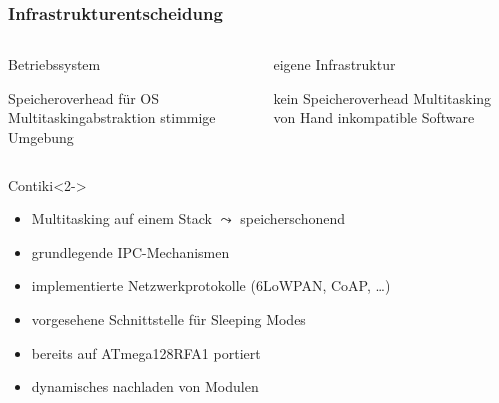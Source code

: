 \subsubsection{Infrastrukturentscheidung}
\begin{frame}{\insertsubsubsection}{}
	\begin{columns}
	\begin{block}{Betriebssystem}
		\begin{proconlist}
		\contra	Speicheroverhead für OS
		\pro	Multitaskingabstraktion
		\pro	stimmige Umgebung
		\end{proconlist}
	\end{block}

	\column{.45\textwidth}
	\begin{block}{eigene Infrastruktur}
		\begin{proconlist}
		\pro	kein Speicheroverhead
		\contra	Multitasking von Hand
		\contra	inkompatible Software
		\end{proconlist}
	\end{block}
	\end{columns}

	\begin{block}{Contiki}<2->
	\begin{itemize}
	\item	Multitasking auf einem Stack \(\leadsto\) speicherschonend
	\item	grundlegende IPC-Mechanismen
	\item	implementierte Netzwerkprotokolle (6LoWPAN, CoAP, \dots)
	\item	vorgesehene Schnittstelle für Sleeping Modes
	\item	bereits auf ATmega128RFA1 portiert
	\item	dynamisches nachladen von Modulen
	\end{itemize}
	\end{block}
\end{frame}
